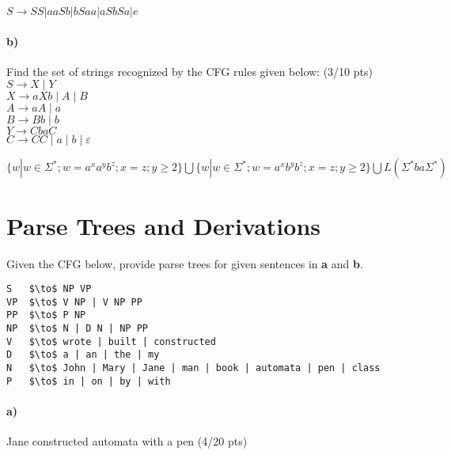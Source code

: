 \documentclass[a4paper,12pt]{article}
\begin{document}
\begin{tcolorbox}
$S \rightarrow SS | aaSb | bSaa | aSbSa | e$
\vspace{1cm} %
\end{tcolorbox}



\paragraph{b)} Find the set of strings recognized by the CFG rules given below:         \hfill \small{(3/10 pts)} \\


$S \to X \mid Y$ \\
$X \to aXb \mid A \mid B$ \\
$A \to aA \mid a$ \\
$B \to Bb \mid b$ \\
$Y \to CbaC$ \\
$C \to CC \mid a \mid b \mid \varepsilon$  \\

\begin{tcolorbox}
$\{  w | w \in \Sigma^{*} ; w= a^{x} a^{y} b^{z} ; x=z ;y \geq 2 \} \bigcup  \{  w | w \in \Sigma^{*} ; w= a^{x} b^{y} b^{z} ; x=z ;y \geq 2 \} \bigcup L(\Sigma^* ba \Sigma^*)$
\vspace{1cm} %
\end{tcolorbox}


\newpage
\section{Parse Trees and Derivations \hfill {}}
Given the CFG below, provide parse trees for given sentences in \textbf{a} and \textbf{b}.\\

\begin{lstlisting}[style=output,mathescape=true]
S   $\to$ NP VP
VP  $\to$ V NP | V NP PP
PP  $\to$ P NP
NP  $\to$ N | D N | NP PP
V   $\to$ wrote | built | constructed
D   $\to$ a | an | the | my
N   $\to$ John | Mary | Jane | man | book | automata | pen | class
P   $\to$ in | on | by | with
\end{lstlisting}

\paragraph{a)} Jane constructed automata with a pen \hfill \small{(4/20 pts)} \\
\end{document}
